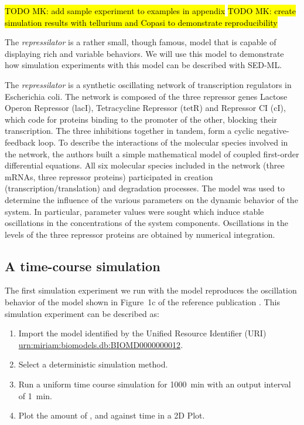\hl{TODO MK: add sample experiment to examples in appendix}
\hl{TODO MK: create simulation results with tellurium and Copasi to demonstrate reproducibility}

The \emph{repressilator} \citep{Elowitz:2000} is a rather small, though famous, model that is capable of displaying rich and variable behaviors. We will use this model to demonstrate how simulation experiments with this model can be described with SED-ML. 

The \emph{repressilator} is a synthetic oscillating network of transcription regulators in Escherichia coli. The network is composed of the three repressor genes Lactose Operon Repressor (lacI), Tetracycline Repressor (tetR) and Repressor CI (cI), which code for proteins binding to the promoter of the other, blocking their transcription. The three inhibitions together in tandem, form a cyclic negative-feedback loop. To describe the interactions of the molecular species involved in the network, the authors built a simple mathematical model of coupled first-order differential equations. All six molecular species included in the network (three mRNAs, three repressor proteins) participated in creation (transcription/translation) and degradation processes. The model was used to determine the influence of the various parameters on the dynamic behavior of the system. In particular, parameter values were sought which induce stable oscillations in the concentrations of the system components. Oscillations in the levels of the three repressor proteins are obtained by numerical integration. 


\subsection{A time-course simulation}
\label{sec:timecourse}
The first simulation experiment we run with the model reproduces the oscillation behavior of the model shown in Figure~1c of the reference publication \citep{Elowitz:2000}. This simulation experiment can be described as:

\begin{enumerate}
 	\item{Import the model identified by the Unified Resource Identifier (URI) \citep{Berners-Lee:2005}\\ 	\url{urn:miriam:biomodels.db:BIOMD0000000012}.}
 	\item {Select a deterministic simulation method.}
 	\item{Run a uniform time course simulation for 1000~min with an output interval of 1~min.}
 	\item{Plot the amount of ,  and  against time in a 2D Plot.}
 \end{enumerate}

